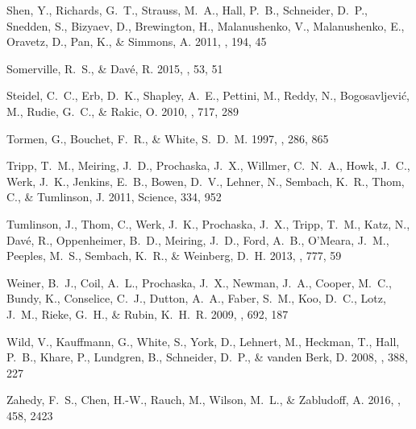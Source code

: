\documentclass[iop]{emulateapj}
\begin{document}
\begin{thebibliography}{52}
{Shen}, Y., {Richards}, G.~T., {Strauss}, M.~A., {Hall}, P.~B., {Schneider},
  D.~P., {Snedden}, S., {Bizyaev}, D., {Brewington}, H., {Malanushenko}, V.,
  {Malanushenko}, E., {Oravetz}, D., {Pan}, K., \& {Simmons}, A. 2011, \apjs,
  194, 45

{Somerville}, R.~S., \& {Dav{\'e}}, R. 2015, \araa, 53, 51

{Steidel}, C.~C., {Erb}, D.~K., {Shapley}, A.~E., {Pettini}, M., {Reddy}, N.,
  {Bogosavljevi{\'c}}, M., {Rudie}, G.~C., \& {Rakic}, O. 2010, \apj, 717, 289

{Tormen}, G., {Bouchet}, F.~R., \& {White}, S.~D.~M. 1997, \mnras, 286, 865

{Tripp}, T.~M., {Meiring}, J.~D., {Prochaska}, J.~X., {Willmer}, C.~N.~A.,
  {Howk}, J.~C., {Werk}, J.~K., {Jenkins}, E.~B., {Bowen}, D.~V., {Lehner}, N.,
  {Sembach}, K.~R., {Thom}, C., \& {Tumlinson}, J. 2011, Science, 334, 952

{Tumlinson}, J., {Thom}, C., {Werk}, J.~K., {Prochaska}, J.~X., {Tripp}, T.~M.,
  {Katz}, N., {Dav{\'e}}, R., {Oppenheimer}, B.~D., {Meiring}, J.~D., {Ford},
  A.~B., {O'Meara}, J.~M., {Peeples}, M.~S., {Sembach}, K.~R., \& {Weinberg},
  D.~H. 2013, \apj, 777, 59

{Weiner}, B.~J., {Coil}, A.~L., {Prochaska}, J.~X., {Newman}, J.~A., {Cooper},
  M.~C., {Bundy}, K., {Conselice}, C.~J., {Dutton}, A.~A., {Faber}, S.~M.,
  {Koo}, D.~C., {Lotz}, J.~M., {Rieke}, G.~H., \& {Rubin}, K.~H.~R. 2009, \apj,
  692, 187

{Wild}, V., {Kauffmann}, G., {White}, S., {York}, D., {Lehnert}, M., {Heckman},
  T., {Hall}, P.~B., {Khare}, P., {Lundgren}, B., {Schneider}, D.~P., \&
  {vanden Berk}, D. 2008, \mnras, 388, 227

{Zahedy}, F.~S., {Chen}, H.-W., {Rauch}, M., {Wilson}, M.~L., \& {Zabludoff},
  A. 2016, \mnras, 458, 2423

\end{thebibliography}
\end{document}
